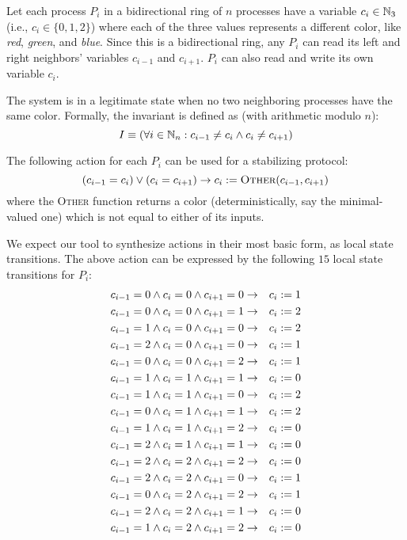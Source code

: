 Let each process $P_i$ in a bidirectional ring of $n$ processes have a variable $c_i\in \mathbb{N}_3$ (i.e., $c_i\in \{0,1,2\}$) where each of the three values represents a different color, like {\it red}, {\it green}, and {\it blue}.
Since this is a bidirectional ring, any $P_i$ can read its left and right neighbors' variables $c_{i-1}$ and $c_{i+1}$.
$P_i$ can also read and write its own variable $c_i$.

The system is in a legitimate state when no two neighboring processes have the same color.
Formally, the invariant is defined as (with arithmetic modulo $n$):
\[ I \equiv (\forall i\in\mathbb{N}_n: c_{i-1}\ne c_i \wedge c_i \ne c_{i+1}) \]

The following action for each $P_i$ can be used for a stabilizing protocol:
\[
 (c_{i-1} = c_i) \vee (c_i = c_{i+1}) \to c_i := \textsc{Other}(c_{i-1}, c_{i+1})
\]
where the \textsc{Other} function returns a color (deterministically, say the minimal-valued one) which is not equal to either of its inputs.

We expect our tool to synthesize actions in their most basic form, as local state transitions.
The above action can be expressed by the following $15$ local state transitions for $P_i$:
\begin{eqnarray*}
 c_{i-1} = 0 \wedge c_i = 0 \wedge c_{i+1} = 0 & \to & c_i := 1 \\
 c_{i-1} = 0 \wedge c_i = 0 \wedge c_{i+1} = 1 & \to & c_i := 2 \\
 c_{i-1} = 1 \wedge c_i = 0 \wedge c_{i+1} = 0 & \to & c_i := 2 \\
 c_{i-1} = 2 \wedge c_i = 0 \wedge c_{i+1} = 0 & \to & c_i := 1 \\
 c_{i-1} = 0 \wedge c_i = 0 \wedge c_{i+1} = 2 & \to & c_i := 1 \\
 c_{i-1} = 1 \wedge c_i = 1 \wedge c_{i+1} = 1 & \to & c_i := 0 \\
 c_{i-1} = 1 \wedge c_i = 1 \wedge c_{i+1} = 0 & \to & c_i := 2 \\
 c_{i-1} = 0 \wedge c_i = 1 \wedge c_{i+1} = 1 & \to & c_i := 2 \\
 c_{i-1} = 1 \wedge c_i = 1 \wedge c_{i+1} = 2 & \to & c_i := 0 \\
 c_{i-1} = 2 \wedge c_i = 1 \wedge c_{i+1} = 1 & \to & c_i := 0 \\
 c_{i-1} = 2 \wedge c_i = 2 \wedge c_{i+1} = 2 & \to & c_i := 0 \\
 c_{i-1} = 2 \wedge c_i = 2 \wedge c_{i+1} = 0 & \to & c_i := 1 \\
 c_{i-1} = 0 \wedge c_i = 2 \wedge c_{i+1} = 2 & \to & c_i := 1 \\
 c_{i-1} = 2 \wedge c_i = 2 \wedge c_{i+1} = 1 & \to & c_i := 0 \\
 c_{i-1} = 1 \wedge c_i = 2 \wedge c_{i+1} = 2 & \to & c_i := 0
\end{eqnarray*}

